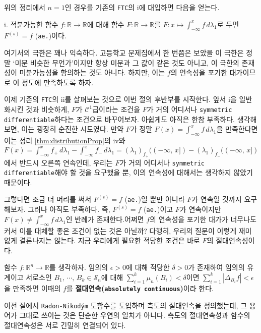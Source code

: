 위의 정리에서 $n=1$인 경우를 기존의 \texttt{FTC}의 i에 대입하면 다음을 얻는다.

 i. 적분가능한 함수 $f:\mathbb{R}\to\mathbb{R}$에 대해 함수 $F:\mathbb{R}\to\mathbb{R}$를 $F:x\mapsto\int_{-\infty}^xf\,d\lambda_1$로 두면 $F^{(s)}=f$ (\texttt{ae.})이다.

\vspace{6pt}
여기서의 극한은 꽤나 익숙하다. 고등학교 문제집에서 한 번쯤은 보았을 이 극한은 정말 `미분 비슷한 무언가'이지만 항상 미분과 그 값이 같은 것도 아니고, 이 극한의 존재성이 미분가능성을 함의하는 것도 아니다. 하지만, 이는 $f$의 연속성을 포기한 대가이므로 이 정도에 만족하도록 하자.

이제 기존의 \texttt{FTC}의 ii를 살펴보는 것으로 이번 절의 후반부를 시작한다. 앞서 i을 일반화시킨 것과 비슷하게, $F$가 $\mathcal{C}^1$급이라는 조건을 $F$가 거의 어디서나 \texttt{symmetric differentiable}하다는 조건으로 바꾸어보자. 아쉽게도 아직은 한참 부족하다. 생각해보면, 이는 굉장히 순진한 시도였다. 만약 $F$가 정말 $F(x)=\int_{-\infty}^xf\,d\lambda_1$을 만족한다면 이는 정리 \ref{thm:distributionProp}의 iv와 $F(x)=\int_{-\infty}^xf_+\,d\lambda_1-\int_{-\infty}^xf_-\,d\lambda_1=(\lambda_1)_{f_+}((-\infty,\,x])-(\lambda_1)_{f_-}((-\infty,\,x])$에서 반드시 오른쪽 연속인데, 우리는 $F$가 거의 어디서나 \texttt{symmetric differentiable}해야 할 것을 요구했을 뿐, 이의 연속성에 대해서는 생각하지 않았기 때문이다.

그렇다면 조금 더 머리를 써서 $F^{(s)}=f$ (\texttt{ae.})일 뿐만 아니라 $F$가 연속일 것까지 요구해보자. 그러나 아직도 부족하다. 즉, $F^{(s)}=f$ (\texttt{ae.})이고 $F$가 연속이지만 $F(x)\ne\int_{-\infty}^xf\,d\lambda_1$인 반례가 존재한다.\footnotemark 어쩌면 $f$의 연속성을 포기한 대가가 너무나도 커서 이를 대체할 좋은 조건이 없는 것은 아닐까? 다행히, 우리의 질문이 이렇게 재미없게 결론나지는 않는다. 지금 우리에게 필요한 적당한 조건은 바로 $F$의 절대연속성이다.

\begin{definition}
    함수 $f:\mathbb{R}^n\to\mathbb{R}$를 생각하자. 임의의 $\epsilon>0$에 대해 적당한 $\delta>0$가 존재하여 임의의 유계이고 서로소인 $B_1,\,\cdots,\,B_k\in\mathcal{S}_n$에 대해 $\sum_{i=1}^k\mu_n(B_i)<\delta$이면 $\sum_{i=1}^k|\Delta_{B_i}f|<\epsilon$을 만족하면 이때의 $f$를 \textbf{절대연속(\texttt{absolutely continuous})}이라 한다.
\end{definition}

이전 절에서 \texttt{Radon-Nikod\'ym} 도함수를 도입하며 측도의 절대연속을 정의했는데, 그 용어가 그대로 쓰이는 것은 단순한 우연의 일치가 아니다. 측도의 절대연속성과 함수의 절대연속성은 서로 긴밀히 연결되어 있다.

